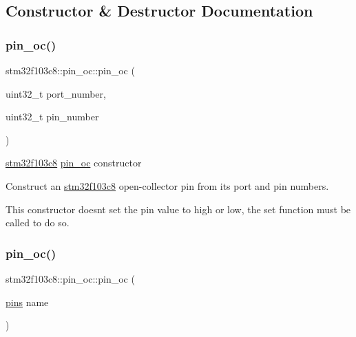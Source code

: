 \subsection{Constructor \& Destructor Documentation}
\mbox{\label{classstm32f103c8_1_1pin__oc_a3cc4f9798d977b88a71f27ba6419cfd6}} 
\subsubsection{\texorpdfstring{pin\+\_\+oc()}{pin\_oc()}\hspace{0.1cm}{\footnotesize\ttfamily [1/2]}}
{\footnotesize\ttfamily stm32f103c8\+::pin\+\_\+oc\+::pin\+\_\+oc (\begin{DoxyParamCaption}\item[{uint32\+\_\+t}]{port\+\_\+number,  }\item[{uint32\+\_\+t}]{pin\+\_\+number }\end{DoxyParamCaption})\hspace{0.3cm}{\ttfamily [inline]}}

\hyperlink{namespacestm32f103c8}{stm32f103c8} \hyperlink{classstm32f103c8_1_1pin__oc}{pin\+\_\+oc} constructor

Construct an \hyperlink{namespacestm32f103c8}{stm32f103c8} open-\/collector pin from its port and pin numbers.

This constructor doesn\textquotesingle{}t set the pin value to high or low, the set function must be called to do so. \mbox{\label{classstm32f103c8_1_1pin__oc_a0a67da6f1d095169e5a82b25f3c9270b}} 
\subsubsection{\texorpdfstring{pin\+\_\+oc()}{pin\_oc()}\hspace{0.1cm}{\footnotesize\ttfamily [2/2]}}
{\footnotesize\ttfamily stm32f103c8\+::pin\+\_\+oc\+::pin\+\_\+oc (\begin{DoxyParamCaption}\item[{\hyperlink{namespacestm32f103c8_a69d642506db309a7e64295d35ec21ff6}{pins}}]{name }\end{DoxyParamCaption})\hspace{0.3cm}{\ttfamily [inline]}}

